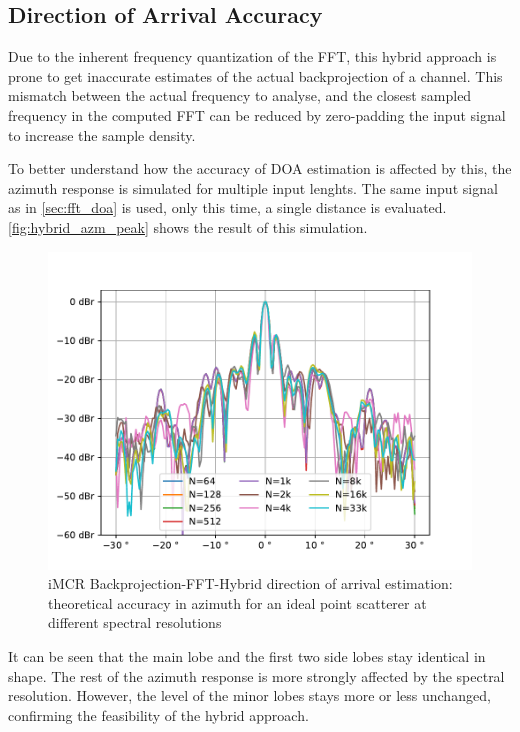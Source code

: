 \subsection{Direction of Arrival Accuracy}

Due to the inherent frequency quantization of the FFT,
this hybrid approach is prone to get inaccurate estimates of the actual backprojection of a channel.
This mismatch between the actual frequency to analyse, and the closest sampled frequency in the computed FFT
can be reduced by zero-padding the input signal to increase the sample density.

To better understand how the accuracy of DOA estimation is affected by this,
the azimuth response is simulated for multiple input lenghts.
The same input signal as in \autoref{sec:fft_doa} is used, only this time, a single distance is evaluated.
\autoref{fig:hybrid_azm_peak} shows the result of this simulation.
\begin{figure}[h]
    \centering
    \includegraphics[width=\textwidth]{../figures/hybrid_azm_peak.pdf}
    \caption{iMCR Backprojection-FFT-Hybrid direction of arrival estimation: 
    theoretical accuracy in azimuth for an ideal point scatterer at different spectral resolutions}
    \label{fig:hybrid_azm_peak}
\end{figure}

It can be seen that the main lobe and the first two side lobes stay identical in shape.
The rest of the azimuth response is more strongly affected by the spectral resolution.
However, the level of the minor lobes stays more or less unchanged,
confirming the feasibility of the hybrid approach.

